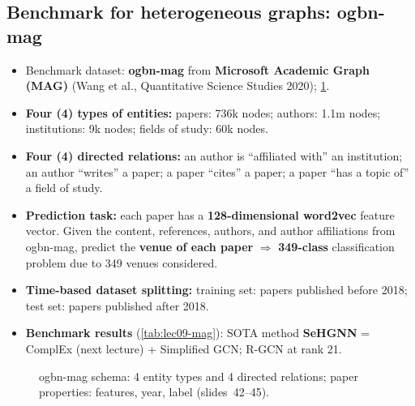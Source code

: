 \subsection{Benchmark for heterogeneous graphs: ogbn-mag}\label{sec:lec09-mag}

\begin{itemize}
  \item Benchmark dataset: \textbf{ogbn-mag} from \textbf{Microsoft Academic
    Graph (MAG)} (Wang et al., Quantitative Science Studies 2020);
    \cref{fig:lec09-mag}.
  \item \textbf{Four (4) types of entities:} papers: 736k nodes; authors: 1.1m
    nodes; institutions: 9k nodes; fields of study: 60k nodes.
  \item \textbf{Four (4) directed relations:} an author is ``affiliated with'' an
    institution; an author ``writes'' a paper; a paper ``cites'' a paper; a paper
    ``has a topic of'' a field of study.
  \item \textbf{Prediction task:} each paper has a \textbf{128-dimensional
    word2vec} feature vector. Given the content, references, authors, and author
    affiliations from ogbn-mag, predict the \textbf{venue of each paper}
    $\Rightarrow$ \textbf{349-class} classification problem due to 349 venues
    considered.
  \item \textbf{Time-based dataset splitting:} training set: papers published
    before 2018; test set: papers published after 2018.
  \item \textbf{Benchmark results} (\cref{tab:lec09-mag}): SOTA method
    \textbf{SeHGNN} = ComplEx (next lecture) + Simplified GCN; R-GCN at rank 21.
\end{itemize}

\begin{figure}[htbp]
  \centering
  \caption{ogbn-mag schema: 4 entity types and 4 directed relations; paper
  properties: features, year, label (slides~42--45).}
  \label{fig:lec09-mag}
\end{figure}

